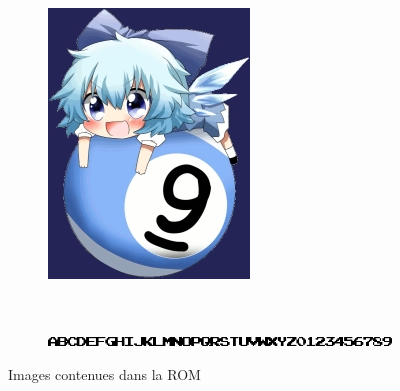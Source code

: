 \begin{figure}[h!]
	\centering
	\begin{subfigure}[b]{0.1\textwidth}
		\centering
		\includegraphics[width=\textwidth]{images/cirno2.jpg}
		\label{fig:cirno2}
	\end{subfigure}
	~

	\begin{subfigure}[b]{0.4\textwidth}
		\centering
		\includegraphics[width=\textwidth]{images/pixelfont.jpg}
		\label{fig:pixelfont}
	\end{subfigure}
	\caption{Images contenues dans la ROM}
\end{figure}


